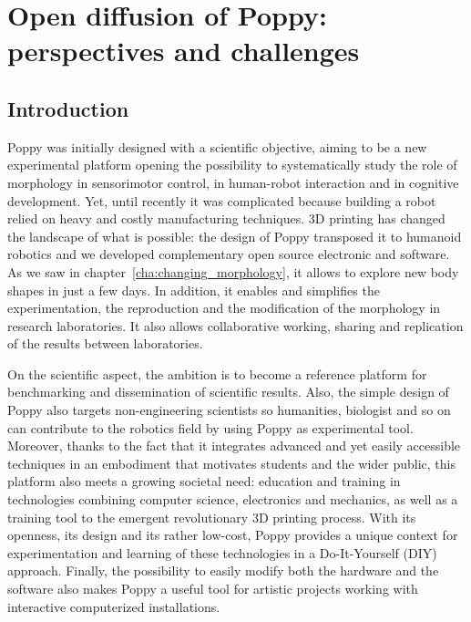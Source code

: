 
\cleartoleftpage


\chapter{Open diffusion of Poppy: perspectives and challenges} %
\label{cha:diffusion}

\section{Introduction} %

Poppy was initially designed with a scientific objective, aiming to be a new experimental platform opening the possibility to systematically study the role of morphology in sensorimotor control, in human-robot interaction and in cognitive development. Yet, until recently it was complicated because building a robot relied on heavy and costly manufacturing techniques. 3D printing has changed the landscape of what is possible: the design of Poppy transposed it to humanoid robotics and we developed complementary open source electronic and software. As we saw in chapter~\ref{cha:changing_morphology}, it allows to explore new body shapes in just a few days.
In addition, it enables and simplifies the experimentation, the reproduction and the modification of the morphology in research laboratories. It also allows collaborative working, sharing and replication of the results between laboratories.

On the scientific aspect, the ambition is to become a reference platform for benchmarking and dissemination of scientific results. Also, the simple design of Poppy also targets non-engineering scientists so humanities, biologist and so on can contribute to the robotics field by using Poppy as experimental tool.
Moreover, thanks to the fact that it integrates advanced and yet easily accessible techniques in an embodiment that motivates students and the wider public, this platform also meets a growing societal need: education and training in technologies combining computer science, electronics and mechanics, as well as a training tool to the emergent revolutionary 3D printing process. With its openness, its design and its rather low-cost, Poppy provides a unique context for experimentation and learning of these technologies in a Do-It-Yourself (DIY) approach.
Finally, the possibility to easily modify both the hardware and the software also makes Poppy a useful tool for artistic projects working with interactive computerized installations.


